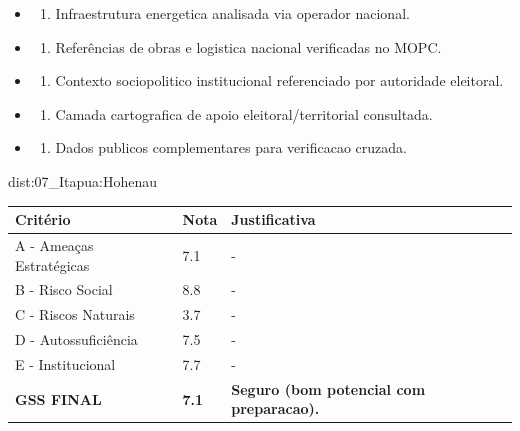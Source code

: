 {\begin{itemize}
\item
  \begin{enumerate}
  \def\labelenumi{\arabic{enumi})}
  \setcounter{enumi}{7}
  \tightlist
  \item
    Infraestrutura energetica analisada via operador nacional.
  \end{enumerate}
\item
  \begin{enumerate}
  \def\labelenumi{\arabic{enumi})}
  \setcounter{enumi}{8}
  \tightlist
  \item
    Referências de obras e logistica nacional verificadas no MOPC.
  \end{enumerate}
\item
  \begin{enumerate}
  \def\labelenumi{\arabic{enumi})}
  \setcounter{enumi}{9}
  \tightlist
  \item
    Contexto sociopolitico institucional referenciado por autoridade
    eleitoral.
  \end{enumerate}
\item
  \begin{enumerate}
  \def\labelenumi{\arabic{enumi})}
  \setcounter{enumi}{10}
  \tightlist
  \item
    Camada cartografica de apoio eleitoral/\allowbreak territorial consultada.
  \end{enumerate}
\item
  \begin{enumerate}
  \def\labelenumi{\arabic{enumi})}
  \setcounter{enumi}{11}
  \tightlist
  \item
    Dados publicos complementares para verificacao cruzada.
  \end{enumerate}
\end{itemize}}{dist:07_Itapua:Hohenau}
\begin{table}[ht!]
\small \begin{tabular}{p{3.0cm}p{0.8cm}p{6.0cm}} \toprule
\textbf{Critério} & \textbf{Nota} & \textbf{Justificativa} \\ \midrule
A - Ameaças Estratégicas & 7.1 & - \\
B - Risco Social & 8.8 & - \\
C - Riscos Naturais & 3.7 & - \\
D - Autossuficiência & 7.5 & - \\
E - Institucional & 7.7 & - \\
\midrule \textbf{GSS FINAL} & \textbf{7.1} & \textbf{Seguro (bom potencial com preparacao).} \\ \bottomrule \end{tabular}
\end{table}
